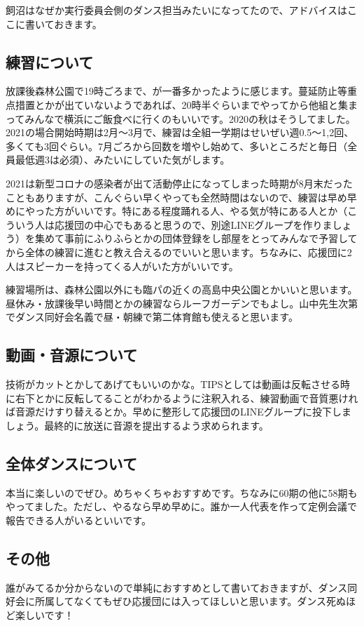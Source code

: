 \documentclass[a4paper]{ltjsreport}
\begin{document}
飼沼はなぜか実行委員会側のダンス担当みたいになってたので、アドバイスはここに書いておきます。

\subsection{練習について}
放課後森林公園で19時ごろまで、が一番多かったように感じます。蔓延防止等重点措置とかが出ていないようであれば、20時半ぐらいまでやってから他組と集まってみんなで横浜にご飯食べに行くのもいいです。2020の秋はそうしてました。
2021の場合開始時期は2月〜3月で、練習は全組一学期はせいぜい週0.5〜1,2回、多くても3回ぐらい。7月ごろから回数を増やし始めて、多いところだと毎日（全員最低週3は必須）、みたいにしていた気がします。

2021は新型コロナの感染者が出て活動停止になってしまった時期が8月末だったこともありますが、こんぐらい早くやっても全然時間はないので、練習は早め早めにやった方がいいです。特にある程度踊れる人、やる気が特にある人とか（こういう人は応援団の中心でもあると思うので、別途LINEグループを作りましょう）を集めて事前にふりふらとかの団体登録をし部屋をとってみんなで予習してから全体の練習に進むと教え合えるのでいいと思います。ちなみに、応援団に2人はスピーカーを持ってくる人がいた方がいいです。

練習場所は、森林公園以外にも臨パの近くの高島中央公園とかいいと思います。昼休み・放課後早い時間とかの練習ならルーフガーデンでもよし。山中先生次第でダンス同好会名義で昼・朝練で第二体育館も使えると思います。

\subsection{動画・音源について}
技術がカットとかしてあげてもいいのかな。TIPSとしては動画は反転させる時に右下とかに反転してることがわかるように注釈入れる、練習動画で音質悪ければ音源だけすり替えるとか。早めに整形して応援団のLINEグループに投下しましょう。最終的に放送に音源を提出するよう求められます。

\subsection{全体ダンスについて}
本当に楽しいのでぜひ。めちゃくちゃおすすめです。ちなみに60期の他に58期もやってました。ただし、やるなら早め早めに。誰か一人代表を作って定例会議で報告できる人がいるといいです。

\subsection{その他}
誰がみてるか分からないので単純におすすめとして書いておきますが、ダンス同好会に所属してなくてもぜひ応援団には入ってほしいと思います。ダンス死ぬほど楽しいです！
\end{document}
